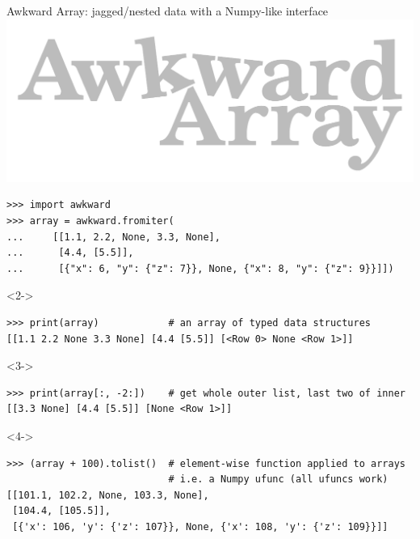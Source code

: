 \documentclass[aspectratio=169]{beamer}
\begin{document}
\begin{frame}[fragile]{Awkward Array: jagged/nested data with a Numpy-like interface}
\vspace{0.35 cm}
\small
\hfill\includegraphics[height=2 cm]{awkward-logo.pdf}

\vspace{-2 cm}
\begin{verbatim}
>>> import awkward
>>> array = awkward.fromiter(
...     [[1.1, 2.2, None, 3.3, None],
...      [4.4, [5.5]],
...      [{"x": 6, "y": {"z": 7}}, None, {"x": 8, "y": {"z": 9}}]])
\end{verbatim}

\begin{uncoverenv}<2->
\begin{verbatim}
>>> print(array)            # an array of typed data structures
[[1.1 2.2 None 3.3 None] [4.4 [5.5]] [<Row 0> None <Row 1>]]
\end{verbatim}
\end{uncoverenv}

\begin{uncoverenv}<3->
\begin{verbatim}
>>> print(array[:, -2:])    # get whole outer list, last two of inner
[[3.3 None] [4.4 [5.5]] [None <Row 1>]]
\end{verbatim}
\end{uncoverenv}

\begin{uncoverenv}<4->
\begin{verbatim}
>>> (array + 100).tolist()  # element-wise function applied to arrays
                            # i.e. a Numpy ufunc (all ufuncs work)
[[101.1, 102.2, None, 103.3, None],
 [104.4, [105.5]],
 [{'x': 106, 'y': {'z': 107}}, None, {'x': 108, 'y': {'z': 109}}]]
\end{verbatim}
\end{uncoverenv}
\end{frame}
\end{document}
